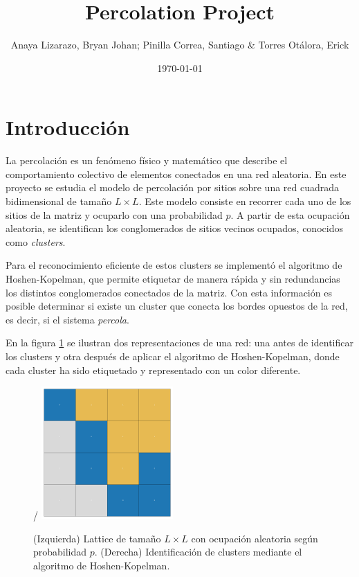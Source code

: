 \documentclass{article}
\title{Percolation Project}
\author{Anaya Lizarazo, Bryan Johan; Pinilla Correa, Santiago \& Torres Otálora, Erick}
\date{\today}
\begin{document}
 

\maketitle

\section{Introducción}

La percolación es un fenómeno físico y matemático que describe el comportamiento colectivo de elementos conectados en una red aleatoria. En este proyecto se estudia el modelo de percolación por sitios sobre una red cuadrada bidimensional de tamaño \( L \times L \). Este modelo consiste en recorrer cada uno de los sitios de la matriz y ocuparlo con una probabilidad \( p \). A partir de esta ocupación aleatoria, se identifican los conglomerados de sitios vecinos ocupados, conocidos como \emph{clusters}.

Para el reconocimiento eficiente de estos clusters se implementó el algoritmo de Hoshen-Kopelman, que permite etiquetar de manera rápida y sin redundancias los distintos conglomerados conectados de la matriz. Con esta información es posible determinar si existe un cluster que conecta los bordes opuestos de la red, es decir, si el sistema \emph{percola}.

En la figura \ref{fig:lattice_clusters} se ilustran dos representaciones de una red: una antes de identificar los clusters y otra después de aplicar el algoritmo de Hoshen-Kopelman, donde cada cluster ha sido etiquetado y representado con un color diferente.

\begin{figure}[h]
    \centering
    /%
    \hfill
    \includegraphics[width=0.45\textwidth]{figures/clusters.pdf}
    \caption{(Izquierda) Lattice de tamaño \( L \times L \) con ocupación aleatoria según probabilidad \( p \). (Derecha) Identificación de clusters mediante el algoritmo de Hoshen-Kopelman.}
    \label{fig:lattice_clusters}
\end{figure}
\end{document}
